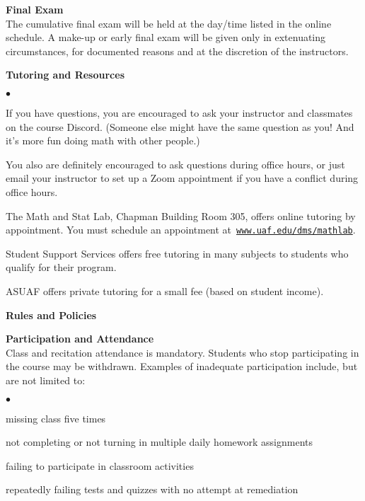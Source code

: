 \documentclass[12pt]{article}
\renewcommand{\emph}[1]{\textsf{\textbf{#1}}}
\newcommand{\localhead}[1]{\par\smallskip\textbf{#1}\nobreak\\}%
\def\heading#1{\localhead{\large\emph{#1}}}
\def\subheading#1{\localhead{\emph{#1}}}
\newenvironment{clist}%
{\bgroup\parskip 0pt\begin{list}{$\bullet$}{\partopsep 4pt\topsep 0pt\itemsep -2pt}}%
{\end{list}\egroup}%
\begin{document}
\heading{Final Exam}
The cumulative final exam will be held at the day/time listed in the online schedule. A make-up or early final exam will be given only in extenuating circumstances, for documented reasons and at the discretion of the instructors.

\heading{Tutoring and Resources}
\vskip -30pt\strut
\begin{clist}
	\item If you have questions, you are encouraged to ask your instructor and classmates on the course Discord. (Someone else might have the same question as you! And it's more fun doing math with other people.)
	\item You also are definitely encouraged to ask questions during office hours, or just email your instructor to set up a Zoom appointment if you have a conflict during office hours.
	\item The Math and Stat Lab, Chapman Building Room 305, offers online tutoring by appointment. You must schedule an appointment at\, \href{http://www.uaf.edu/dms/mathlab/}{\texttt{www.uaf.edu/dms/mathlab}}. %
	\item Student Support Services offers free tutoring in many subjects to students who qualify for their program.
	\item ASUAF offers private tutoring for a small fee (based on student income).
\end{clist}

\heading{Rules and Policies}
\vskip -20pt
\subheading{Participation and Attendance}
Class and recitation attendance is mandatory. Students who stop participating in the course may be withdrawn. Examples of inadequate participation include,
but are not limited to:
\begin{clist}
\item missing class five times
\item not completing or not turning in multiple daily homework assignments
\item failing to participate in classroom activities
\item repeatedly failing tests and quizzes with no attempt at remediation
\end{clist}
\end{document}
